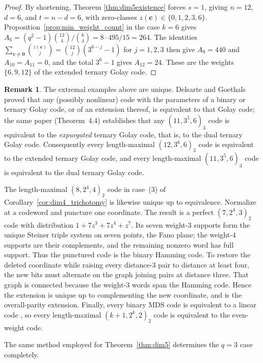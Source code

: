 \documentclass[12pt, letterpaper]{article}
\theoremstyle{plain}
\theoremstyle{definition}
\newtheorem{remark}[theorem]{Remark}
\begin{document}
	\begin{proof}
		By shortening, Theorem \ref{thm:dim5existence} forces $s = 1$, giving $n = 12$, $d = 6$, and $t = n-d = 6$, with zero-classes $z(\mathbf c) \in \{0,1,2,3,6\}$. Proposition~\ref{prop:min_weight_count} in the case $k = 6$ gives $A_6 = (q^2-1)\binom{12}{4}/\binom{6}{4} = 8 \cdot 495/15 = 264$. The identities $\sum_{\mathbf c \ne \mathbf 0}\binom{z(\mathbf c)}{j} = \binom{12}{j}(3^{6-j}-1)$ for $j = 1,2,3$ then give $A_9 = 440$ and $A_{10} = A_{11} = 0$, and the total $3^6-1$ gives $A_{12} = 24$. These are the weights $\{6,9,12\}$ of the extended ternary Golay code.
	\end{proof}

	\begin{remark}\label{rem:uniqueness}
		The extremal examples above are unique. Delsarte and Goethals \cite{DelsarteGoethals1975} proved that any (possibly nonlinear) code with the parameters of a binary or ternary Golay code, or of an extension thereof, is equivalent to that Golay code; the same paper (Theorem~4.4) establishes that any $(11,3^5,6)_3$ code is equivalent to the \emph{expurgated} ternary Golay code, that is, to the dual ternary Golay code. Consequently every length-maximal $(12,3^6,6)_3$ code is equivalent to the extended ternary Golay code, and every length-maximal $(11,3^5,6)_3$ code is equivalent to the dual ternary Golay code.

		The length-maximal $(8,2^4,4)_2$ code in case~(3) of Corollary~\ref{cor:dim4_trichotomy} is likewise unique up to equivalence. Normalize at a codeword and puncture one coordinate. The result is a perfect $(7,2^4,3)_2$ code with distribution $1+7z^3+7z^4+z^7$. Its seven weight-$3$ supports form the unique Steiner triple system on seven points, the Fano plane; the weight-$4$ supports are their complements, and the remaining nonzero word has full support. Thus the punctured code is the binary Hamming code. To restore the deleted coordinate while raising every distance-$3$ pair to distance at least four, the new bits must alternate on the graph joining pairs at distance three. That graph is connected because the weight-$3$ words span the Hamming code. Hence the extension is unique up to complementing the new coordinate, and is the overall-parity extension. Finally, every binary MDS code is equivalent to a linear code \cite[Theorem~4]{Alderson2020}, so every length-maximal $(k+1,2^k,2)_2$ code is equivalent to the even-weight code.
	\end{remark}

	The same method employed for Theorem~\ref{thm:dim5} determines the $q=3$ case completely.
\end{document}
